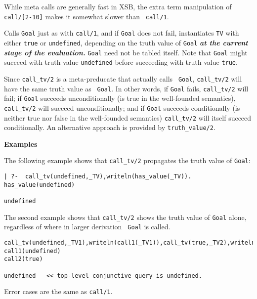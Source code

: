 \begin{description}
While meta calls are generally fast in XSB, the extra term
manipulation of {\tt call/[2-10]} makes it somewhat slower than {\tt
  call/1}.

%
Calls {\tt Goal} just as with {\tt call/1}, and if {\tt Goal} does not
fail, instantiates {\tt TV} with either {\tt true} or {\tt undefined},
depending on the truth value of {\tt Goal} {\bf {\em at the current
    stage of the evaluation.}}  {\tt Goal} need not be tabled itself.
Note that {\tt Goal} might succeed with truth value {\tt undefined}
before succeeding with truth value {\tt true}.

Since {\tt call\_tv/2} is a meta-preducate that actually calls {\tt
  Goal}, {\tt call\_tv/2} will have the same truth value as {\tt
  Goal}.  In other words, if {\tt Goal} fails, {\tt call\_tv/2} will
fail; if {\tt Goal} succeeds unconditionally (is true in the
well-founded semantics), {\tt call\_tv/2} will succeed
unconditionally; and if {\tt Goal} succeeds conditionally (is neither
true nor false in the well-founded semantics) {\tt call\_tv/2} will
itself succeed conditionally.  An alternative approach is provided by
{\tt truth\_value/2}.

{\bf Examples}

The following example shows that {\tt call\_tv/2} propagates the truth
value of {\tt Goal}:
\begin{small}
\begin{verbatim}
| ?-  call_tv(undefined,_TV),writeln(has_value(_TV)).
has_value(undefined)

undefined
\end{verbatim}
\end{small}

The second example shows that {\tt call\_tv/2} shows the truth value
of {\tt Goal} alone, regardless of where in larger derivation {\tt
  Goal} is called.
%
\begin{small}
\begin{verbatim}
call_tv(undefined,_TV1),writeln(call1(_TV1)),call_tv(true,_TV2),writeln(call2(_TV2)).
call1(undefined)
call2(true)

undefined   << top-level conjunctive query is undefined.
\end{verbatim}
\end{small}

Error cases are the same as {\tt call/1}.


\end{description}

